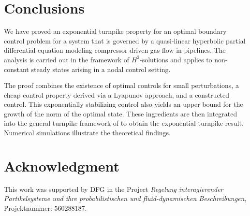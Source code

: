 \documentclass[12pt]{article}
\numberwithin{equation}{section}
\begin{document}
\section{Conclusions}\label{section:6}
We have proved an exponential turnpike property for an optimal boundary control problem 
for a system that is governed by a quasi-linear hyperbolic
partial differential equation 
modeling compressor-driven gas flow in pipelines. The analysis is carried out in the framework of $H^2$-solutions and applies to non-constant steady states arising in a nodal control setting.

The proof combines the existence of optimal controls for small perturbations, a cheap control property derived via a Lyapunov approach, and a constructed control. 
This exponentially stabilizing control also yields an
upper bound for the growth of the norm of the  optimal state.
These ingredients are then integrated into the general turnpike framework of \cite{MR4955417} to obtain the exponential turnpike result.
Numerical simulations illustrate the theoretical findings.

\section*{Acknowledgment}
This work was supported by DFG in the  Project  
\emph{Regelung interagierender Partikelsysteme und ihre
probabilistischen und fluid-dynamischen Beschreibungen},
Projektnummer: 560288187.






\end{document}
